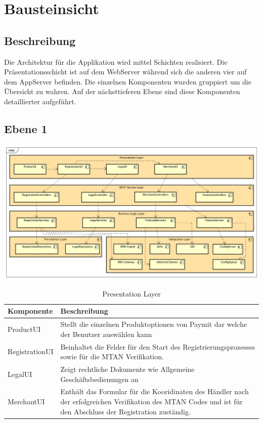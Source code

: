 \graphicspath{{./images/}}

\chapter{Bausteinsicht}

\section{Beschreibung}

Die Architektur für die Applikation wird mittel Schichten realisiert. Die Präsentationsschicht ist auf dem WebServer während sich die anderen vier auf dem AppServer befinden. Die einzelnen Komponenten wurden gruppiert um die Übersicht zu wahren. Auf der nächsttieferen Ebene sind diese Komponenten detaillierter aufgeführt.

\begin{landscape}
\section{Ebene 1}

\begin{center}
	\includegraphics[scale=0.6]{ComponentLevel1.png}
\end{center}

\end{landscape}
\restoregeometry

\begin{table}[H]
	\centering
	\caption{Presentation Layer}
	\begin{tabular}{ | p{4cm} | p{11cm} | }
		\toprule
		{\textbf{Komponente}} & {\textbf{Beschreibung}} \\
		\midrule
		ProductUI &  Stellt die einzelnen Produktoptionen von Paymit dar welche der Benutzer auswählen kann\\ \hline
		RegistrationUI  &  Beinhaltet die Felder für den Start des Registrierungsprozesses sowie für die MTAN Verifikation.\\ \hline
		LegalUI &  Zeigt rechtliche Dokumente wie Allgemeine Geschäftsbedienungen an \\ \hline
		MerchantUI & Enthält das Formular für die Kooridinaten des Händler nach der erfolgreichen Verifikation des MTAN Codes und ist für den Abschluss der Registration zuständig.\\
		\bottomrule
	\end{tabular}
\end{table}

